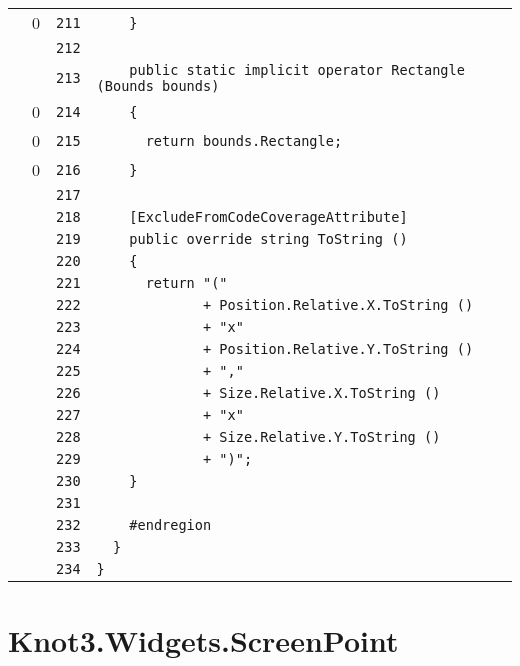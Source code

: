 \documentclass[a4paper,10pt]{article}
\begin{document}
\begin{longtable}[l]{lrrl}
\cellcolor{red} & 0 & \verb~211~ & \verb~    }~\\
\cellcolor{gray} &  & \verb~212~ & \verb~~\\
\cellcolor{gray} &  & \verb~213~ & \verb~    public static implicit operator Rectangle (Bounds bounds)~\\
\cellcolor{red} & 0 & \verb~214~ & \verb~    {~\\
\cellcolor{red} & 0 & \verb~215~ & \verb~      return bounds.Rectangle;~\\
\cellcolor{red} & 0 & \verb~216~ & \verb~    }~\\
\cellcolor{gray} &  & \verb~217~ & \verb~~\\
\cellcolor{gray} &  & \verb~218~ & \verb~    [ExcludeFromCodeCoverageAttribute]~\\
\cellcolor{gray} &  & \verb~219~ & \verb~    public override string ToString ()~\\
\cellcolor{gray} &  & \verb~220~ & \verb~    {~\\
\cellcolor{gray} &  & \verb~221~ & \verb~      return "("~\\
\cellcolor{gray} &  & \verb~222~ & \verb~             + Position.Relative.X.ToString ()~\\
\cellcolor{gray} &  & \verb~223~ & \verb~             + "x"~\\
\cellcolor{gray} &  & \verb~224~ & \verb~             + Position.Relative.Y.ToString ()~\\
\cellcolor{gray} &  & \verb~225~ & \verb~             + ","~\\
\cellcolor{gray} &  & \verb~226~ & \verb~             + Size.Relative.X.ToString ()~\\
\cellcolor{gray} &  & \verb~227~ & \verb~             + "x"~\\
\cellcolor{gray} &  & \verb~228~ & \verb~             + Size.Relative.Y.ToString ()~\\
\cellcolor{gray} &  & \verb~229~ & \verb~             + ")";~\\
\cellcolor{gray} &  & \verb~230~ & \verb~    }~\\
\cellcolor{gray} &  & \verb~231~ & \verb~~\\
\cellcolor{gray} &  & \verb~232~ & \verb~    #endregion~\\
\cellcolor{gray} &  & \verb~233~ & \verb~  }~\\
\cellcolor{gray} &  & \verb~234~ & \verb~}~\\
\end{longtable}
\newpage
\section{Knot3.Widgets.ScreenPoint}
\end{document}

